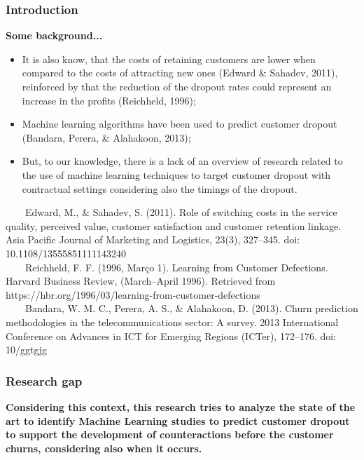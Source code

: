 \documentclass[10pt]{beamer}
\begin{document}
\begin{frame}
	\frametitle{Introduction}
	\Large
	\textbf{Some background...}\\
		\begin{itemize} \normalsize

			\item It is also know, that the costs of retaining customers are lower when compared to the costs of attracting new ones \footnotesize(Edward \& Sahadev, 2011)\normalsize, reinforced by that the reduction of the dropout rates could represent an increase in the profits \footnotesize(Reichheld, 1996)\normalsize;
			\item Machine learning algorithms have been used to predict customer dropout \footnotesize(Bandara, Perera, \& Alahakoon, 2013)\normalsize;
			\item But, to our knowledge, there is a lack of an overview of research related to the use of machine learning techniques to target customer dropout with contractual settings considering also the timings of the dropout.
			
		\end{itemize}	
	\tiny
	~~~~Edward, M., \& Sahadev, S. (2011). Role of switching costs in the service quality, perceived value, customer satisfaction and customer retention linkage. Asia Pacific Journal of Marketing and Logistics, 23(3), 327–345. doi: 10.1108/13555851111143240 \\
	~~~~Reichheld, F. F. (1996, Março 1). Learning from Customer Defections. Harvard Business Review, (March–April 1996). Retrieved from https://hbr.org/1996/03/learning-from-customer-defections \\
	~~~~Bandara, W. M. C., Perera, A. S., \& Alahakoon, D. (2013). Churn prediction methodologies in the telecommunications sector: A survey. 2013 International Conference on Advances in ICT for Emerging Regions (ICTer), 172–176. doi: 10/ggtgjg\\
\end{frame}

\begin{frame}
	\frametitle{Research gap}
	\textbf{\large{Considering this context, this research tries to analyze the state of the art to identify Machine Learning studies to predict customer dropout to support the development of counteractions before the customer churns, considering also when it occurs.}}
\end{frame}
\end{document}

